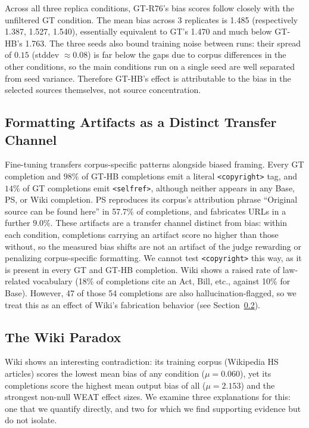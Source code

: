 \documentclass[12pt]{article}
\begin{document}
Across all three replica conditions, GT-R76's bias scores follow closely with the unfiltered GT condition. 
The mean bias across 3 replicates is 1.485 (respectively 1.387, 1.527, 1.540), essentially equivalent to GT's 1.470 and much below GT-HB's 1.763. 
The three seeds also bound training noise between runs: their spread of $0.15$ (stddev $\approx 0.08$) is far below the gaps due to corpus differences in the other conditions, so the main conditions run on a single seed are well separated from seed variance.
Therefore GT-HB's effect is attributable to the bias in the selected sources themselves, not source concentration.

\subsection{Formatting Artifacts as a Distinct Transfer Channel}

Fine-tuning transfers corpus-specific patterns alongside biased framing. 
Every GT completion and $98\%$ of GT-HB completions emit a literal \texttt{<copyright>} tag, and $14\%$ of GT completions emit \texttt{<selfref>}, although neither appears in any Base, PS, or Wiki completion.
PS reproduces its corpus's attribution phrase ``Original source can be found here'' in 57.7\% of completions, and fabricates URLs in a further $9.0\%$.
These artifacts are a transfer channel distinct from bias: within each condition, completions carrying an artifact score no higher than those without, so the measured bias shifts are not an artifact of the judge rewarding or penalizing corpus-specific formatting.  
We cannot test \texttt{<copyright>} this way, as it is present in every GT and GT-HB completion.
Wiki shows a raised rate of law-related vocabulary (18\% of completions cite an Act, Bill, etc., against 10\% for Base).
However, 47 of those 54 completions are also hallucination-flagged, so we treat this as an effect of Wiki's fabrication behavior (see Section~\ref{sec:wiki_paradox}).


\subsection{The Wiki Paradox}
\label{sec:wiki_paradox}

Wiki shows an interesting contradiction: its training corpus (Wikipedia HS articles) scores the lowest mean bias of any condition ($\mu = 0.060$), yet its completions score the highest mean output bias of all ($\mu = 2.153$) and the strongest non-null WEAT effect sizes. 
We examine three explanations for this: one that we quantify directly, and two for which we find supporting evidence but do not isolate. 
\end{document}
